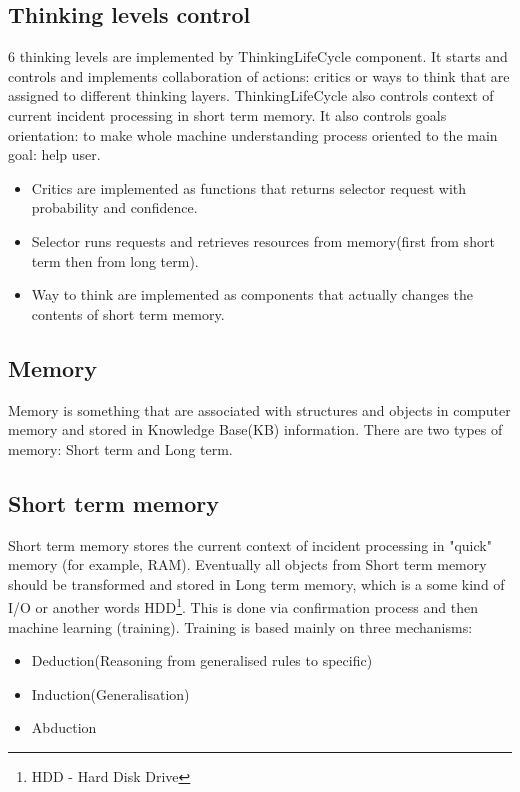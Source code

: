 \documentclass[conference]{IEEEtran}
\begin{document}
\subsection{Thinking levels control}

6 thinking levels are implemented by ThinkingLifeCycle component. It starts and controls and implements collaboration of actions: critics or ways to think that are assigned to different thinking layers. ThinkingLifeCycle also controls context of current incident processing in short term memory. It also controls goals orientation: to make whole machine understanding process oriented to the main goal: help user.\\

\begin{itemize}
  \item Critics are implemented as functions that returns selector request with probability and confidence.
  \item Selector runs requests and retrieves resources from memory(first from short term then from long term).
  \item Way to think are implemented as components that actually changes the contents of short term memory.
\end{itemize}

\subsection{Memory}

Memory is something that are associated with structures and objects in computer memory and stored in Knowledge Base(KB) information.
There are two types of memory: Short term and Long term. 

\subsection{Short term memory}

Short term memory stores the current context of incident processing in "quick" memory (for example, RAM). Eventually all objects from Short term memory should be transformed and stored in Long term memory, which is a some kind of I/O or another words HDD\footnote{HDD - Hard Disk Drive}. This is done via confirmation process and then machine learning (training).
Training is based mainly on three mechanisms:
\begin{itemize}
  \item Deduction(Reasoning from generalised rules to specific)
  \item Induction(Generalisation)
  \item Abduction
\end{itemize}
\end{document}
